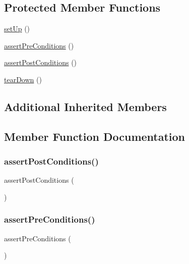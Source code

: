 \subsection*{Protected Member Functions}
\begin{DoxyCompactItemize}
\item 
\mbox{\hyperlink{class_exception_in_test_a0bc688732d2b3b162ffebaf7812e78da}{set\+Up}} ()
\item 
\mbox{\hyperlink{class_exception_in_test_ad6402f56c691a56954229b7e6a2294aa}{assert\+Pre\+Conditions}} ()
\item 
\mbox{\hyperlink{class_exception_in_test_abf54422376f10d9cbe49a06676e39e86}{assert\+Post\+Conditions}} ()
\item 
\mbox{\hyperlink{class_exception_in_test_a80fe3d17e658907fc75346a0ec9d6fc7}{tear\+Down}} ()
\end{DoxyCompactItemize}
\subsection*{Additional Inherited Members}


\subsection{Member Function Documentation}
\mbox{\label{class_exception_in_test_abf54422376f10d9cbe49a06676e39e86}} 
\subsubsection{\texorpdfstring{assert\+Post\+Conditions()}{assertPostConditions()}}
{\footnotesize\ttfamily assert\+Post\+Conditions (\begin{DoxyParamCaption}{ }\end{DoxyParamCaption})\hspace{0.3cm}{\ttfamily [protected]}}

\mbox{\label{class_exception_in_test_ad6402f56c691a56954229b7e6a2294aa}} 
\subsubsection{\texorpdfstring{assert\+Pre\+Conditions()}{assertPreConditions()}}
{\footnotesize\ttfamily assert\+Pre\+Conditions (\begin{DoxyParamCaption}{ }\end{DoxyParamCaption})\hspace{0.3cm}{\ttfamily [protected]}}

